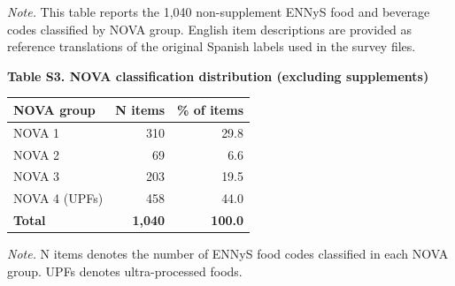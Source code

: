 ﻿\documentclass{article}
\newcommand{\manualtablecaption}[1]{%
  \par\centering\textbf{#1}\par\vspace{0.4em}%
}
\newcommand{\tabnote}[1]{%
  \vspace{0.06cm}%
  {\footnotesize\setstretch{1}\par\raggedright\textit{Note.} #1\par}%
}
\begin{document}
\clearpage

\tabnote{This table reports the 1,040 non-supplement ENNyS food and beverage codes classified by NOVA group. English item descriptions are provided as reference translations of the original Spanish labels used in the survey files.}

\clearpage
\vspace{0.8em}
\begin{table}[!htbp]
\centering
\manualtablecaption{Table S3. NOVA classification distribution (excluding supplements)}
\begin{tabular}{lrr}
\toprule
\textbf{NOVA group} & \textbf{N items} & \textbf{\% of items}\\
\midrule
NOVA 1 & 310 & 29.8\\
NOVA 2 & 69 & 6.6\\
NOVA 3 & 203 & 19.5\\
NOVA 4 (UPFs) & 458 & 44.0\\
\midrule
\textbf{Total} & \textbf{1,040} & \textbf{100.0}\\
\bottomrule
\end{tabular}
\tabnote{N items denotes the number of ENNyS food codes classified in each NOVA group. UPFs denotes ultra-processed foods.}
\end{table}
\end{document}
